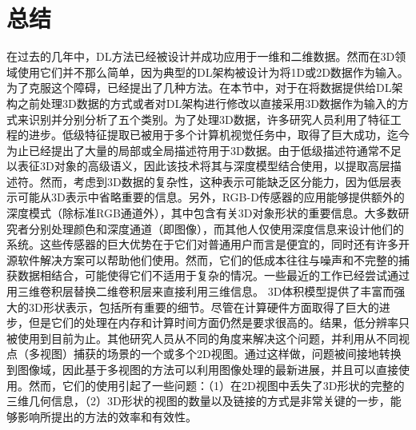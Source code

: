 \section{总结}
在过去的几年中，DL方法已经被设计并成功应用于一维和二维数据。然而在3D领域使用它们并不那么简单，因为典型的DL架构被设计为将1D或2D数据作为输入。为了克服这个障碍，已经提出了几种方法。在本节中，对于在将数据提供给DL架构之前处理3D数据的方式或者对DL架构进行修改以直接采用3D数据作为输入的方式来识别并分别分析了五个类别。为了处理3D数据，许多研究人员利用了特征工程的进步。低级特征提取已被用于多个计算机视觉任务中，取得了巨大成功，迄今为止已经提出了大量的局部或全局描述符用于3D数据。由于低级描述符通常不足以表征3D对象的高级语义，因此该技术将其与深度模型结合使用，以提取高层描述符。然而，考虑到3D数据的复杂性，这种表示可能缺乏区分能力，因为低层表示可能从3D表示中省略重要的信息。另外，RGB-D传感器的应用能够提供额外的深度模式（除标准RGB通道外），其中包含有关3D对象形状的重要信息。大多数研究者分别处理颜色和深度通道（即图像），而其他人仅使用深度信息来设计他们的系统。这些传感器的巨大优势在于它们对普通用户而言是便宜的，同时还有许多开源软件解决方案可以帮助他们使用。然而，它们的低成本往往与噪声和不完整的捕获数据相结合，可能使得它们不适用于复杂的情况。一些最近的工作已经尝试通过用三维卷积层替换二维卷积层来直接利用三维信息。 3D体积模型提供了丰富而强大的3D形状表示，包括所有重要的细节。尽管在计算硬件方面取得了巨大的进步，但是它们的处理在内存和计算时间方面仍然是要求很高的。结果，低分辨率只被使用到目前为止。其他研究人员从不同的角度来解决这个问题，并利用从不同视点（多视图）捕获的场景的一个或多个2D视图。通过这样做，问题被间接地转换到图像域，因此基于多视图的方法可以利用图像处理的最新进展，并且可以直接使用。然而，它们的使用引起了一些问题：（1）在2D视图中丢失了3D形状的完整的三维几何信息，（2）3D形状的视图的数量以及链接的方式是非常关键的一步，能够影响所提出的方法的效率和有效性。
